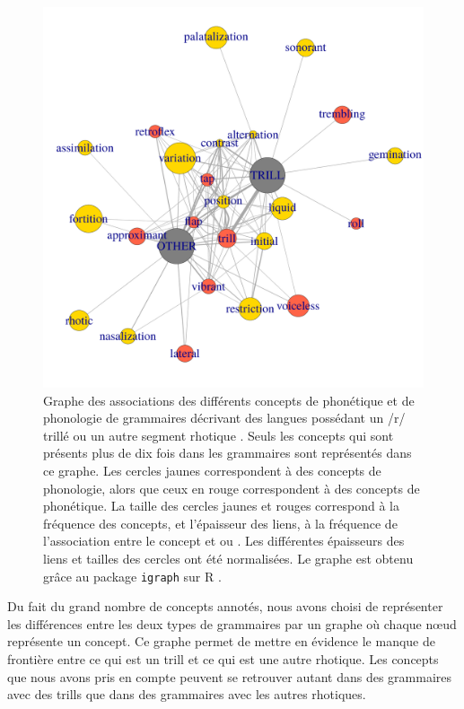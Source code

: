 \begin{figure}
	\centering
	\includegraphics[width=1\linewidth]{substance/images/graph_results}
	\caption[Graphe des associations des différents concepts de phonétique et de phonologie à  et à ]{Graphe des associations des différents concepts de phonétique et de phonologie de grammaires décrivant des langues possédant un /r/ trillé  ou un autre segment rhotique . Seuls les concepts qui sont présents plus de dix fois dans les grammaires sont représentés dans ce graphe. Les cercles jaunes correspondent à des concepts de phonologie, alors que ceux en rouge correspondent à des concepts de phonétique. La taille des cercles jaunes et rouges correspond à la fréquence des concepts, et l'épaisseur des liens, à la fréquence de l'association entre le concept et  ou . Les différentes épaisseurs des liens et tailles des cercles ont été normalisées. Le graphe est obtenu grâce au package \texttt{igraph} sur R \parencite{csardiIgraphSoftwarePackage2006}.}
	\label{fig:graphresults}
\end{figure}

Du fait du grand nombre de concepts annotés, nous avons choisi de représenter les différences entre les deux types de grammaires par un graphe où chaque nœud représente un concept. Ce graphe permet de mettre en évidence le manque de frontière entre ce qui est un trill et ce qui est une autre rhotique. Les concepts que nous avons pris en compte peuvent se retrouver autant dans des grammaires avec des trills que dans des grammaires avec les autres rhotiques.\\

